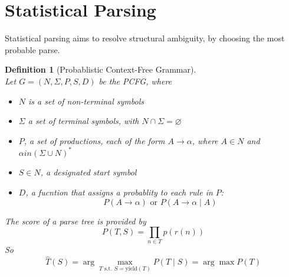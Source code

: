 \documentclass[12pt]{article}
\newtheorem{definition}{Definition}[section]
\theoremstyle{definition}
\begin{document}
\section{Statistical Parsing}
Statistical parsing aims to resolve structural ambiguity, by choosing the most probable parse.
\begin{definition}[Probablistic Context-Free Grammar]
\hfill\\\normalfont Let $G=(N, \Sigma, P, S, D)$ be the PCFG, where
\begin{itemize}
	\item $N$ is a set of non-terminal symbols
	\item $\Sigma$ a set of terminal symbols, with $N\cap \Sigma = \varnothing$
	\item $P$, a set of productions, each of the form $A\to \alpha$, where $A\in N$ and $\alpha in (\Sigma \cup N)^\ast$
	\item $S\in N$, a designated start symbol
	\item $D$, a fucntion that assigns a probablity to each rule in $P$:
	\[
	P(A\to \alpha) \text{ or }P(A\to \alpha\mid A)
	\]
\end{itemize}
The score of a parse tree is provided by 
\[
P(T, S) = \prod_{n\in T}p(r(n))
\]
So 
\[
\hat{T}(S) = \arg\max_{T \text{ s.t. } S=\text{yield}(T)}P(T\mid S) = \arg\max P(T)
\]
\end{definition}
\end{document}
